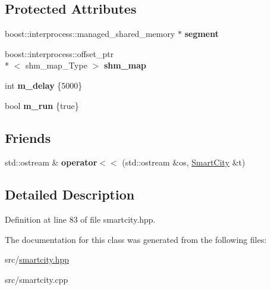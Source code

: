 \subsection*{Protected Attributes}
\begin{DoxyCompactItemize}
\item 
\hypertarget{classjustine_1_1robocar_1_1SmartCity_a4cdc70fa86d8bc7b71fc21eaaf640e06}{boost\-::interprocess\-::managed\-\_\-shared\-\_\-memory $\ast$ {\bfseries segment}}\label{classjustine_1_1robocar_1_1SmartCity_a4cdc70fa86d8bc7b71fc21eaaf640e06}

\item 
\hypertarget{classjustine_1_1robocar_1_1SmartCity_a1ddc2da8c48cde78087c4f49480cd013}{boost\-::interprocess\-::offset\-\_\-ptr\\*
$<$ shm\-\_\-map\-\_\-\-Type $>$ {\bfseries shm\-\_\-map}}\label{classjustine_1_1robocar_1_1SmartCity_a1ddc2da8c48cde78087c4f49480cd013}

\item 
\hypertarget{classjustine_1_1robocar_1_1SmartCity_abfe14f7488da07e158d10baa3d2ae48f}{int {\bfseries m\-\_\-delay} \{5000\}}\label{classjustine_1_1robocar_1_1SmartCity_abfe14f7488da07e158d10baa3d2ae48f}

\item 
\hypertarget{classjustine_1_1robocar_1_1SmartCity_a672c1f8a8550bff2f7c7f90f6ad09251}{bool {\bfseries m\-\_\-run} \{true\}}\label{classjustine_1_1robocar_1_1SmartCity_a672c1f8a8550bff2f7c7f90f6ad09251}

\end{DoxyCompactItemize}
\subsection*{Friends}
\begin{DoxyCompactItemize}
\item 
\hypertarget{classjustine_1_1robocar_1_1SmartCity_ac57d36e7cbaee1f2b1dd137e82a26cf9}{std\-::ostream \& {\bfseries operator$<$$<$} (std\-::ostream \&os, \hyperlink{classjustine_1_1robocar_1_1SmartCity}{Smart\-City} \&t)}\label{classjustine_1_1robocar_1_1SmartCity_ac57d36e7cbaee1f2b1dd137e82a26cf9}

\end{DoxyCompactItemize}


\subsection{Detailed Description}


Definition at line 83 of file smartcity.\-hpp.



The documentation for this class was generated from the following files\-:\begin{DoxyCompactItemize}
\item 
src/\hyperlink{smartcity_8hpp}{smartcity.\-hpp}\item 
src/smartcity.\-cpp\end{DoxyCompactItemize}
